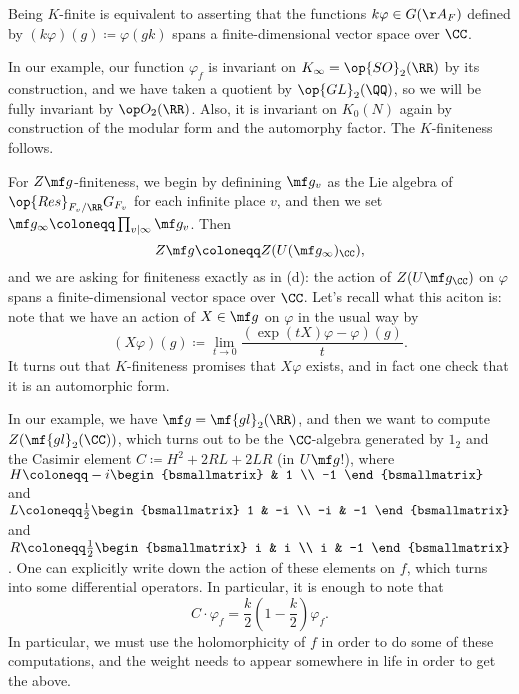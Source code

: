 \documentclass{article}
\begin{document}
\begin{listalph}
	\item Being $K$-finite is equivalent to asserting that the functions $k\varphi\in G(\AA_F)$ defined by $(k\varphi)(g)\coloneqq\varphi(gk)$ spans a finite-dimensional vector space over $\CC$.

	In our example, our function $\varphi_f$ is invariant on $K_\infty=\op{SO}_2(\RR)$ by its construction, and we have taken a quotient by $\op{GL}_2(\QQ)$, so we will be fully invariant by $\op O_2(\RR)$. Also, it is invariant on $K_0(N)$ again by construction of the modular form and the automorphy factor. The $K$-finiteness follows.

	\item For $Z\mf g$-finiteness, we begin by definining $\mf g_v$ as the Lie algebra of $\op{Res}_{F_v/\RR}G_{F_v}$ for each infinite place $v$, and then we set $\mf g_\infty\coloneqq\prod_{v\mid\infty}\mf g_v$. Then
	\[Z\mf g\coloneqq Z(U(\mf g_\infty)_\CC),\]
	and we are asking for finiteness exactly as in (d): the action of $Z(U\mf g_\CC)$ on $\varphi$ spans a finite-dimensional vector space over $\CC$. Let's recall what this aciton is: note that we have an action of $X\in\mf g$ on $\varphi$ in the usual way by
	\[(X\varphi)(g)\coloneqq\lim_{t\to0}\frac{(\exp(tX)\varphi-\varphi)(g)}t.\]
	It turns out that $K$-finiteness promises that $X\varphi$ exists, and in fact one check that it is an automorphic form.

	In our example, we have $\mf g=\mf{gl}_2(\RR)$, and then we want to compute $Z(\mf{gl}_2(\CC))$, which turns out to be the $\CC$-algebra generated by $1_2$ and the Casimir element $C\coloneqq H^2+2RL+2LR$ (in $U\mf g$!), where $H\coloneqq-i\begin{bsmallmatrix}
		& 1 \\ -1
	\end{bsmallmatrix}$ and $L\coloneqq\frac12\begin{bsmallmatrix}
		1 & -i \\ -i & -1
	\end{bsmallmatrix}$ and $R\coloneqq\frac12\begin{bsmallmatrix}
		i & i \\ i & -1
	\end{bsmallmatrix}$. One can explicitly write down the action of these elements on $f$, which turns into some differential operators. In particular, it is enough to note that
	\[C\cdot\varphi_f=\frac k2\left(1-\frac k2\right)\varphi_f.\]
	In particular, we must use the holomorphicity of $f$ in order to do some of these computations, and the weight needs to appear somewhere in life in order to get the above.


\end{listalph}
\end{document}

